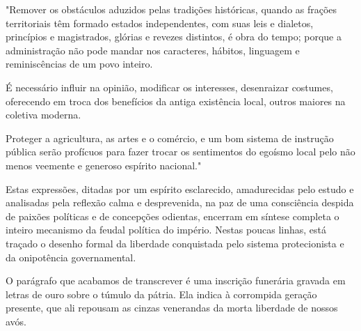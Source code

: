 "Remover os obstáculos aduzidos pelas tradições históricas, quando as
frações territoriais têm formado estados independentes, com suas leis e
dialetos, princípios e magistrados, glórias e revezes distintos, é obra
do tempo; porque a administração não pode mandar nos caracteres,
hábitos, linguagem e reminiscências de um povo inteiro.

É necessário influir na opinião, modificar os interesses, desenraizar
costumes, oferecendo em troca dos benefícios da antiga existência local,
outros maiores na coletiva moderna.

Proteger a agricultura, as artes e o comércio, e um bom sistema de
instrução pública serão profícuos para fazer trocar os sentimentos do
egoísmo local pelo não menos veemente e generoso espírito nacional."

Estas expressões, ditadas por um espírito esclarecido, amadurecidas pelo
estudo e analisadas pela reflexão calma e desprevenida, na paz de uma
consciência despida de paixões políticas e de concepções odientas,
encerram em síntese completa o inteiro mecanismo da feudal política do
império. Nestas poucas linhas, está traçado o desenho formal da
liberdade conquistada pelo sistema protecionista e da onipotência
governamental.

O parágrafo que acabamos de transcrever é uma inscrição funerária
gravada em letras de ouro sobre o túmulo da pátria. Ela indica à
corrompida geração presente, que ali repousam as cinzas venerandas da
morta liberdade de nossos avós.


